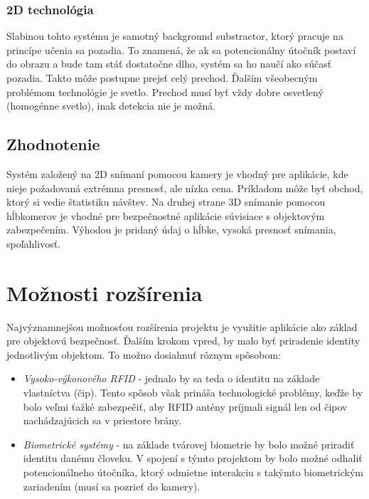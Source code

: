 \subsubsection{2D technológia}
Slabinou tohto systému je samotný background substractor, ktorý pracuje na princípe učenia sa pozadia. To znamená, že ak sa potencionálny útočník postaví do obrazu a bude tam stáť dostatočne dlho, systém sa ho naučí ako súčasť pozadia. Takto môže postupne prejsť celý prechod. Ďalším všeobecným problémom technológie je svetlo. Prechod musí byť vždy dobre osvetlený (homogénne svetlo), inak detekcia nie je možná. 

\vspace{5mm}

\subsection{Zhodnotenie}
Systém založený na 2D snímaní pomocou kamery je vhodný pre aplikácie, kde nieje požadovaná extrémna presnosť, ale nízka cena. Príkladom môže byť obchod, ktorý si vedie štatistiku návštev. Na druhej strane 3D snímanie pomocou hĺbkomerov je vhodné pre bezpečnostné aplikácie súvisiace s objektovým zabezpečením. Výhodou je pridaný údaj o hĺbke, vysoká presnosť snímania, spoľahlivosť.       


\section{Možnosti rozšírenia}
Najvýznamnejšou možnosťou rozšírenia projektu je využitie aplikácie ako základ pre objektovú bezpečnosť. Ďalším krokom vpred, by malo byť priradenie identity jednotlivým objektom. To možno dosiahnuť rôznym spôsobom: 

\begin{itemize}
\item \textit{Vysoko-výkonového RFID} - jednalo by sa teda o identitu na základe vlastníctva (čip). Tento spôsob však prináša technologické problémy, keďže by bolo veľmi ťažké zabezpečiť, aby RFID antény príjmali signál len od čipov nachádzajúcich sa v priestore brány. 
\item \textit{Biometrické systémy} - na základe tvárovej biometrie by bolo možné priradiť identitu danému človeku. V spojení s týmto projektom by bolo možné odhaliť potencionálneho útočníka, ktorý odmietne interakciu s takýmto biometrickým zariadením (musí sa pozrieť do kamery). 
\end{itemize}



